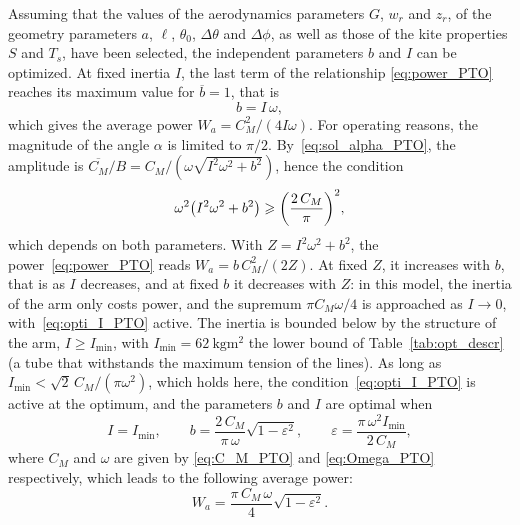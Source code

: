 Assuming that the values of the aerodynamics parameters \(G\), \(w_r\) and \(z_r\), of the geometry parameters \(a\), \(\ell\), \(\theta_0\), \(\Delta \theta\) and \(\Delta \phi\), as well as those of the kite properties \(S\) and \(T_s\), have been selected, the independent parameters \(b\) and \(I\) can be optimized.
At fixed inertia \(I\), the last term of the relationship \eqref{eq:power_PTO} reaches its maximum value for \(\overline{b}=1\), that is
\begin{equation} \label{pto_optimality_constraint}
    b=I\,\omega,
\end{equation}
which gives the average power \(W_a = C_M^2/(4I\omega)\).
For operating reasons, the magnitude of the angle \(\alpha\) is limited to \(\pi/2\). By~\eqref{eq:sol_alpha_PTO}, the amplitude is \(\overline{C_M}/B = C_M/(\omega\sqrt{I^2\omega^2+b^2})\), hence the condition
\begin{equation} \label{eq:opti_I_PTO}
    \omega^2\qty(I^2\omega^2 + b^2) \geqslant \qty(\frac{2\,C_M}{\pi})^2,
\end{equation}
which depends on both parameters.
With \(Z = I^2\omega^2+b^2\), the power~\eqref{eq:power_PTO} reads \(W_a = b\,C_M^2/(2Z)\).
At fixed \(Z\), it increases with \(b\), that is as \(I\) decreases, and at fixed \(b\) it decreases with \(Z\): in this model, the inertia of the arm only costs power, and the supremum \(\pi C_M\omega/4\) is approached as \(I\to0\), with~\eqref{eq:opti_I_PTO} active.
The inertia is bounded below by the structure of the arm, \(I\geq I_{\min}\), with \(I_{\min} = \SI{62}{\kilogram\meter\squared}\) the lower bound of Table~\ref{tab:opt_descr} (a tube that withstands the maximum tension of the lines).
As long as \(I_{\min} < \sqrt2\,C_M/(\pi\omega^2)\), which holds here, the condition~\eqref{eq:opti_I_PTO} is active at the optimum, and the parameters \(b\) and \(I\) are optimal when
\begin{equation} \label{eq:opti_b_I_PTO}
    I = I_{\min}, \qquad b = \frac{2\,C_M}{\pi\,\omega}\sqrt{1-\varepsilon^2}, \qquad \varepsilon = \frac{\pi\,\omega^2 I_{\min}}{2\,C_M},
\end{equation}
where \(C_M\) and \(\omega\) are given by \eqref{eq:C_M_PTO} and \eqref{eq:Omega_PTO} respectively, which leads to the following average power:
\begin{equation} \label{eq:opti_power_PTO_final}
    W_a =\frac{\pi\,C_M\,\omega}{4}\sqrt{1-\varepsilon^2}.
\end{equation}
